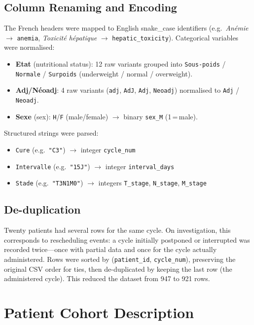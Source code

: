 \documentclass[12pt,a4paper]{report}
\begin{document}
\subsection{Column Renaming and Encoding}

The French headers were mapped to English snake\_case identifiers (e.g.\ \textit{Anémie} $\to$ \texttt{anemia}, \textit{Toxicité hépatique} $\to$ \texttt{hepatic\_toxicity}). Categorical variables were normalised:
\begin{itemize}
  \item \textbf{Etat} (nutritional status): 12 raw variants grouped into \texttt{Sous-poids} / \texttt{Normale} / \texttt{Surpoids} (underweight / normal / overweight).
  \item \textbf{Adj/Néoadj}: 4 raw variants (\texttt{adj}, \texttt{AdJ}, \texttt{Adj}, \texttt{Neoadj}) normalised to \texttt{Adj} / \texttt{Neoadj}.
  \item \textbf{Sexe} (sex): \texttt{H}/\texttt{F} (male/female) $\to$ binary \texttt{sex\_M} (1\,=\,male).
\end{itemize}

Structured strings were parsed:
\begin{itemize}
  \item \texttt{Cure} (e.g.\ \texttt{"C3"}) $\to$ integer \texttt{cycle\_num}
  \item \texttt{Intervalle} (e.g.\ \texttt{"15J"}) $\to$ integer \texttt{interval\_days}
  \item \texttt{Stade} (e.g.\ \texttt{"T3N1M0"}) $\to$ integers \texttt{T\_stage}, \texttt{N\_stage}, \texttt{M\_stage}
\end{itemize}

\subsection{De-duplication}

Twenty patients had several rows for the same cycle. On investigation, this corresponds to rescheduling events: a cycle initially postponed or interrupted was recorded twice---once with partial data and once for the cycle actually administered. Rows were sorted by (\texttt{patient\_id}, \texttt{cycle\_num}), preserving the original CSV order for ties, then de-duplicated by keeping the last row (the administered cycle). This reduced the dataset from 947 to 921 rows.

\section{Patient Cohort Description}
\end{document}

